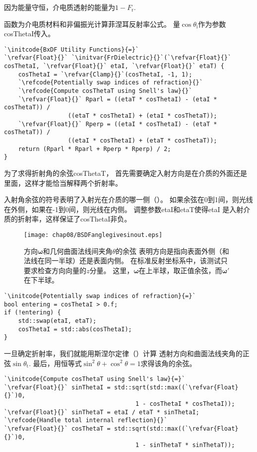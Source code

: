 因为能量守恒，介电质透射的能量为$1-F_{\mathrm{r}}$.

函数为介电质材料和非偏振光计算菲涅耳反射率公式。
量$\cos\theta_{\mathrm{i}}$作为参数{\ttfamily cosThetaI}传入。
\begin{lstlisting}
`\initcode{BxDF Utility Functions}{=}`
`\refvar{Float}{}` `\initvar{FrDielectric}{}`(`\refvar{Float}{}` cosThetaI, `\refvar{Float}{}` etaI, `\refvar{Float}{}` etaT) {
    cosThetaI = `\refvar{Clamp}{}`(cosThetaI, -1, 1);
    `\refcode{Potentially swap indices of refraction}{}`
    `\refcode{Compute cosThetaT using Snell's law}{}`
    `\refvar{Float}{}` Rparl = ((etaT * cosThetaI) - (etaI * cosThetaT)) /
                  ((etaT * cosThetaI) + (etaI * cosThetaT));
    `\refvar{Float}{}` Rperp = ((etaI * cosThetaI) - (etaT * cosThetaT)) /
                  ((etaI * cosThetaI) + (etaT * cosThetaT));
    return (Rparl * Rparl + Rperp * Rperp) / 2;
}
\end{lstlisting}

为了求得折射角的余弦{\ttfamily cosThetaT}，
首先需要确定入射方向是在介质的外面还是里面，这样才能恰当解释两个折射率。

入射角余弦的符号表明了入射光在介质的哪一侧（）。
如果余弦在0到1间，则光线在外侧，如果在-1到0间，则光线在内侧。
调整参数{\ttfamily etaI}和{\ttfamily etaT}使得{\ttfamily etaI}
是入射介质的折射率，这样保证了{\ttfamily cosThetaI}非负。

\begin{figure}[htbp]
    \centering
    \texttt{[image: chap08/BSDFanglegivesinout.eps]}
    \caption{方向$\bm\omega$和几何曲面法线间夹角$\theta$的余弦
        表明方向是指向表面外侧（和法线在同一半球）还是表面内侧。
        在标准反射坐标系中，该测试只要求检查方向向量的$z$分量。
        这里，$\bm\omega$在上半球，取正值余弦，而${\bm\omega}'$在下半球。}
    \label{fig:8.5}
\end{figure}

\begin{lstlisting}
`\initcode{Potentially swap indices of refraction}{=}`
bool entering = cosThetaI > 0.f;
if (!entering) {
    std::swap(etaI, etaT);
    cosThetaI = std::abs(cosThetaI);
}
\end{lstlisting}

一旦确定折射率，我们就能用斯涅尔定律（）计算
透射方向和曲面法线夹角的正弦$\sin\theta_{\mathrm{t}}$.
最后，用恒等式$\sin^2\theta+\cos^2\theta=1$求得该角的余弦。
\begin{lstlisting}
`\initcode{Compute cosThetaT using Snell's law}{=}`
`\refvar{Float}{}` sinThetaI = std::sqrt(std::max((`\refvar{Float}{}`)0,
                                     1 - cosThetaI * cosThetaI));
`\refvar{Float}{}` sinThetaT = etaI / etaT * sinThetaI;
`\refcode{Handle total internal reflection}{}`
`\refvar{Float}{}` cosThetaT = std::sqrt(std::max((`\refvar{Float}{}`)0,
                                     1 - sinThetaT * sinThetaT));
\end{lstlisting}


